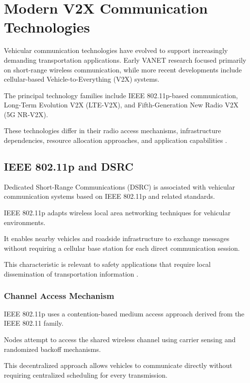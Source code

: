 
\section{Modern V2X Communication Technologies}
\label{sec:modern_v2x}

Vehicular communication technologies have
evolved to support increasingly demanding
transportation applications. Early VANET
research focused primarily on short-range
wireless communication, while more recent
developments include cellular-based
Vehicle-to-Everything (V2X) systems.

The principal technology families include
IEEE 802.11p-based communication,
Long-Term Evolution V2X (LTE-V2X),
and Fifth-Generation New Radio V2X
(5G NR-V2X).

These technologies differ in their
radio access mechanisms, infrastructure
dependencies, resource allocation
approaches, and application capabilities
\cite{MacHardy2018,Naik2019}.

\subsection{IEEE 802.11p and DSRC}

Dedicated Short-Range Communications
(DSRC) is associated with vehicular
communication systems based on
IEEE 802.11p and related standards.

IEEE 802.11p adapts wireless local
area networking techniques for
vehicular environments.

It enables nearby vehicles and
roadside infrastructure to exchange
messages without requiring a
cellular base station for each
direct communication session.

This characteristic is relevant
to safety applications that
require local dissemination
of transportation information
\cite{Karagiannis2011}.

\subsubsection{Channel Access Mechanism}

IEEE 802.11p uses a contention-based
medium access approach derived from
the IEEE 802.11 family.

Nodes attempt to access the shared
wireless channel using carrier sensing
and randomized backoff mechanisms.

This decentralized approach allows
vehicles to communicate directly
without requiring centralized
scheduling for every transmission.

